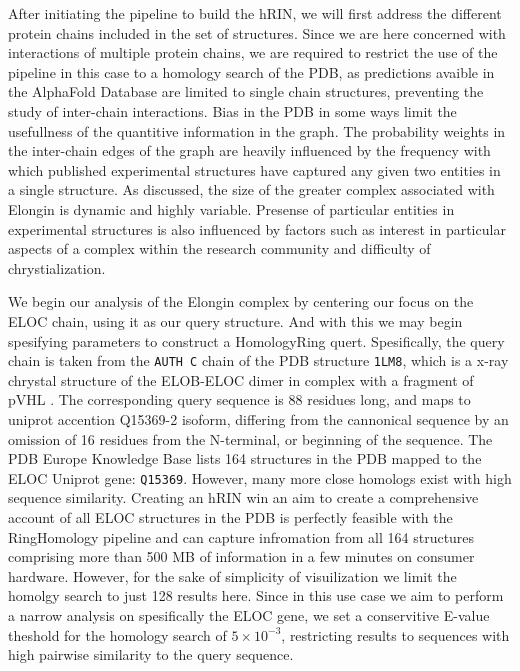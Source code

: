 After initiating the pipeline to build the hRIN, we will first address the different protein chains included in the set of structures. 
Since we are here concerned with interactions of multiple protein chains, we are required to restrict the use of the pipeline in this case to a homology search of the PDB, as predictions avaible in the AlphaFold Database are limited to single chain structures, preventing the study of inter-chain interactions. 
Bias in the PDB in some ways limit the usefullness of the quantitive information in the graph. The probability weights in the inter-chain edges of the graph are heavily influenced by the frequency with which published experimental structures have captured any given two entities in a single structure. As discussed, the size of the greater complex associated with Elongin is dynamic and highly variable. 
Presense of particular entities in experimental structures is also influenced by factors such as interest in particular aspects of a complex within the research community and difficulty of chrystialization. 

We begin our analysis of the Elongin complex by centering our focus on the ELOC chain, using it as our query structure. And with this we may begin spesifying parameters to construct a HomologyRing quert. Spesifically, the query chain is taken from the \texttt{AUTH C} chain of the PDB structure \texttt{1LM8}, which is a x-ray chrystal structure of the ELOB-ELOC dimer in complex with a fragment of pVHL \cite{Min2002}. The corresponding query sequence is 88 residues long, and maps to uniprot accention {Q15369-2} isoform, differing from the cannonical sequence by an omission of 16 residues from the N-terminal, or beginning of the sequence. 
The PDB Europe Knowledge Base lists 164 structures in the PDB mapped to the ELOC Uniprot gene: \texttt{Q15369}. However, many more close homologs exist with high sequence similarity.
Creating an hRIN win an aim to create a comprehensive account of all ELOC structures in the PDB is perfectly feasible with the RingHomology pipeline and can capture infromation from all 164 structures comprising more than 500 MB of information in a few minutes on consumer hardware. However, for the sake of simplicity of visuilization we limit the homolgy search to just 128 results here. Since in this use case we aim to perform a narrow analysis on spesifically the ELOC gene, we set a conservitive E-value theshold for the homology search of $5 \times 10^{-3}$, restricting results to sequences with high pairwise similarity to the query sequence.


